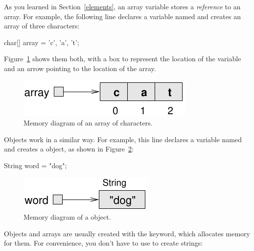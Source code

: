 
As you learned in Section~\ref{elements}, an array variable stores a {\em reference} to an array.
For example, the following line declares a variable named  and creates an array of three characters:

\begin{code}
    char[] array = {'c', 'a', 't'};
\end{code}

Figure~\ref{fig.mem2} shows them both, with a box to represent the location of the variable and an arrow pointing to the location of the array.

\begin{figure}[!ht]
\begin{center}
\includegraphics{figs/mem2.pdf}
\caption{Memory diagram of an array of characters.}
\label{fig.mem2}
\end{center}
\end{figure}

Objects work in a similar way.
For example, this line declares a  variable named  and creates a  object, as shown in Figure~\ref{fig.mem3}:

\begin{code}
String word = "dog";
\end{code}

\begin{figure}[!ht]
\begin{center}
\includegraphics{figs/mem3.pdf}
\caption{Memory diagram of a  object.}
\label{fig.mem3}
\end{center}
\end{figure}

Objects and arrays are usually created with the  keyword, which allocates memory for them. %
For convenience, you don't have to use  to create strings:

